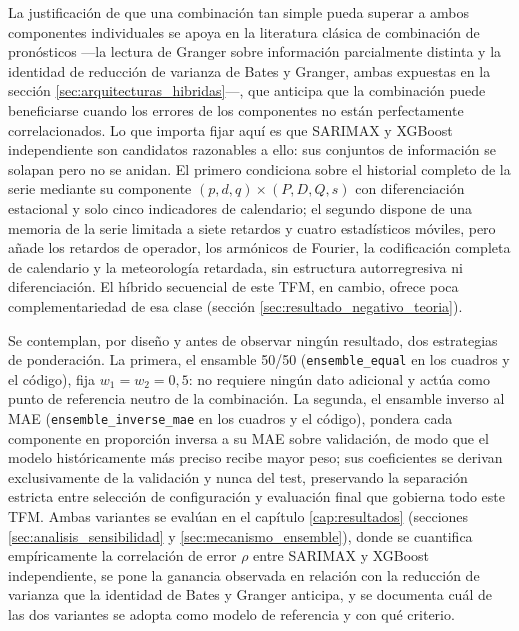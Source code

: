 La justificación de que una combinación tan simple pueda superar a ambos componentes
individuales se apoya en la literatura clásica de combinación de pronósticos —la lectura
de Granger sobre información parcialmente distinta y la identidad de reducción de varianza
de Bates y Granger, ambas expuestas en la sección \ref{sec:arquitecturas_hibridas}—, que
anticipa que la combinación puede beneficiarse cuando los errores de los componentes no
están perfectamente correlacionados. Lo que importa fijar aquí es que SARIMAX y XGBoost
independiente son candidatos razonables a ello: sus conjuntos de información se solapan
pero no se anidan. El primero condiciona sobre el historial completo
de la serie mediante su componente $(p,d,q)\times(P,D,Q,s)$ con diferenciación estacional
y solo cinco indicadores de calendario; el segundo dispone de una memoria de la serie
limitada a siete retardos y cuatro estadísticos móviles, pero añade los retardos de
operador, los armónicos de Fourier, la codificación completa de calendario y la
meteorología retardada, sin estructura autorregresiva ni diferenciación. El híbrido
secuencial de este TFM, en cambio, ofrece poca complementariedad de esa clase (sección
\ref{sec:resultado_negativo_teoria}).

Se contemplan, por diseño y antes de observar ningún resultado, dos estrategias de
ponderación. La primera, el ensamble 50/50 (\texttt{ensemble\_equal} en los cuadros y el
código), fija $w_1 = w_2 = 0{,}5$: no requiere ningún dato adicional y actúa como punto
de referencia neutro de la combinación. La segunda, el ensamble inverso al MAE
(\texttt{ensemble\_inverse\_mae} en los cuadros y el código), pondera cada componente en
proporción inversa a su MAE sobre validación, de modo que el modelo históricamente más
preciso recibe mayor peso; sus coeficientes se derivan exclusivamente de la validación y
nunca del test, preservando la separación estricta entre selección de configuración y
evaluación final que gobierna todo este TFM. Ambas variantes se evalúan en el capítulo
\ref{cap:resultados} (secciones \ref{sec:analisis_sensibilidad} y
\ref{sec:mecanismo_ensemble}), donde se cuantifica empíricamente la correlación de error
$\rho$ entre SARIMAX y XGBoost independiente, se pone la ganancia observada en relación
con la reducción de varianza que la identidad de Bates y Granger anticipa, y se documenta
cuál de las dos variantes se adopta como modelo de referencia y con qué criterio.
